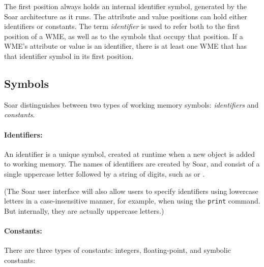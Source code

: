 The first position always holds an internal identifier symbol, generated by the Soar architecture as
it runs. The attribute and value positions can hold either identifiers or constants.
The term \emph{identifier} is used to refer both to the first position of
a WME, as well as to the symbols that occupy that position.
If a WME's attribute or value is an identifier, there is at least one WME that has 
that identifier symbol in its first position. 


\subsection{Symbols}
\label{SYNTAX-wm-symbols}

Soar distinguishes between two types of working memory symbols: \emph{identifiers} and {\em constants}. 

\paragraph{Identifiers:}

An identifier is a unique symbol, created at runtime when 
a new object is added to working memory. The names of 
identifiers are
created by Soar, and consist of a single uppercase letter followed by a string
of digits, such as  or .

(The Soar user interface will also allow users to specify identifiers using
lowercase letters in a case-insensitive manner, for example, when using the \texttt{print} command.
But internally, they are actually uppercase letters.)

\paragraph{Constants:} 

There are three types of constants: integers,
floating-point, and symbolic constants:\vspace{-10pt}

